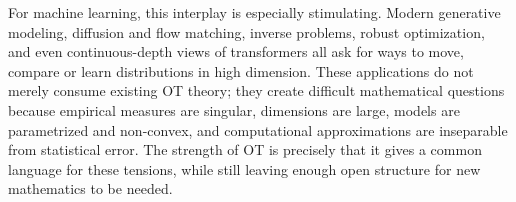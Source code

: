 \documentclass[10pt,a4paper,twoside,openany]{book}
\makeatletter
\renewcommand{\cleardoublepage}{%
	\clearpage
	\if@twoside
		\ifodd\c@page
		\else
			\hbox{}\thispagestyle{empty}\newpage
			\if@twocolumn\hbox{}\newpage\fi
		\fi
	\fi
}
\makeatother
\begin{document}
For machine learning, this interplay is especially stimulating. Modern generative modeling, diffusion and flow matching, inverse problems, robust optimization, and even continuous-depth views of transformers all ask for ways to move, compare or learn distributions in high dimension. These applications do not merely consume existing OT theory; they create difficult mathematical questions because empirical measures are singular, dimensions are large, models are parametrized and non-convex, and computational approximations are inseparable from statistical error. The strength of OT is precisely that it gives a common language for these tensions, while still leaving enough open structure for new mathematics to be needed.





\clearpage
\appendix


\cleardoublepage
\printindex
\end{document}
